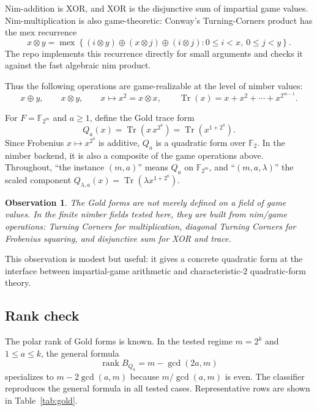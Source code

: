 \documentclass[11pt]{article}
\theoremstyle{plain}
\newtheorem{observation}{Observation}
\theoremstyle{definition}
\newcommand{\F}{\mathbb{F}}
\newcommand{\Tr}{\operatorname{Tr}}
\newcommand{\nimmul}{\otimes}
\newcommand{\mex}{\operatorname{mex}}
\begin{document}
Nim-addition is XOR, and XOR is the disjunctive sum of impartial game values.
Nim-multiplication is also game-theoretic: Conway's Turning-Corners product has
the mex recurrence
\begin{equation}\label{eq:tc}
  x\nimmul y
  =
  \mex
  \left\{
    (i\nimmul y)\oplus(x\nimmul j)\oplus(i\nimmul j):
    0\leq i<x,\ 0\leq j<y
  \right\}.
\end{equation}
The repo implements this recurrence directly for small arguments and checks it
against the fast algebraic nim product.

Thus the following operations are game-realizable at the level of nimber
values:
\[
  x\oplus y,\qquad x\nimmul y,\qquad x\mapsto x^2=x\nimmul x,\qquad
  \Tr(x)=x+x^2+\cdots+x^{2^{m-1}}.
\]

For $F=\F_{2^m}$ and $a\geq 1$, define the Gold trace form
\[
  Q_a(x)=\Tr\!\left(x\,x^{2^a}\right)=\Tr\!\left(x^{1+2^a}\right).
\]
Since Frobenius $x\mapsto x^{2^a}$ is additive, $Q_a$ is a quadratic form over
$\F_2$. In the nimber backend, it is also a composite of the game operations
above. Throughout, ``the instance $(m,a)$'' means $Q_a$ on $\F_{2^m}$, and
``$(m,a,\lambda)$'' the scaled component $Q_{\lambda,a}(x)=\Tr(\lambda
x^{1+2^a})$.

\begin{observation}\label{obs:built}
The Gold forms are not merely defined on a field of game values. In the finite
nimber fields tested here, they are built from nim/game operations: Turning
Corners for multiplication, diagonal Turning Corners for Frobenius squaring,
and disjunctive sum for XOR and trace.
\end{observation}

This observation is modest but useful: it gives a concrete quadratic form at
the interface between impartial-game arithmetic and characteristic-$2$
quadratic-form theory.

\subsection{Rank check}

The polar rank of Gold forms is known. In the tested regime
$m=2^k$ and $1\leq a\leq k$, the general formula
\[
  \operatorname{rank} B_{Q_a}=m-\gcd(2a,m)
\]
specializes to $m-2\gcd(a,m)$ because $m/\gcd(a,m)$ is even. The classifier
reproduces the general formula in all tested cases. Representative rows are
shown in Table~\ref{tab:gold}.
\end{document}
